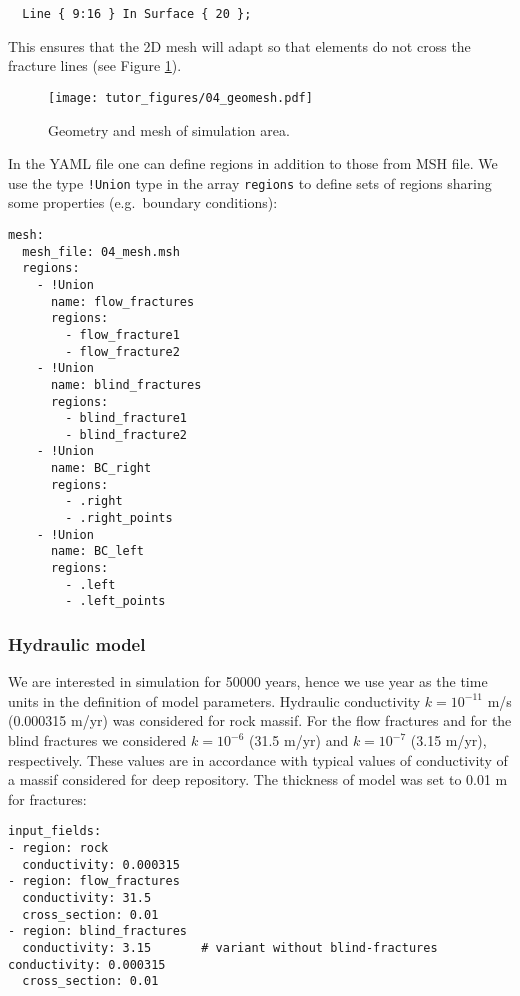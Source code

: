 \begin{verbatim}
  Line { 9:16 } In Surface { 20 };
\end{verbatim}

This ensures that the 2D mesh will adapt so that elements do not cross
the fracture lines (see Figure \ref{fig:mesh}).

\begin{figure}[htbp]
\centering
\texttt{[image: tutor\_figures/04\_geomesh.pdf]}
\caption{Geometry and mesh of simulation area.\label{fig:mesh}}
\end{figure}

In the YAML file one can define regions in addition to those from MSH
file. We use the type \texttt{!Union} type in the array \texttt{regions}
to define sets of regions sharing some properties (e.g.~boundary
conditions):

\begin{verbatim}
mesh:
  mesh_file: 04_mesh.msh
  regions:
    - !Union
      name: flow_fractures
      regions:
        - flow_fracture1
        - flow_fracture2
    - !Union
      name: blind_fractures
      regions:
        - blind_fracture1
        - blind_fracture2
    - !Union
      name: BC_right
      regions:
        - .right
        - .right_points
    - !Union
      name: BC_left
      regions:
        - .left
        - .left_points
\end{verbatim}

\subsubsection{Hydraulic model}

We are interested in simulation for 50000 years, hence we use year as
the time units in the definition of model parameters. Hydraulic
conductivity \(k = 10^{-11}\) m/s (0.000315 m/yr) was considered for
rock massif. For the flow fractures and for the blind fractures we
considered \(k = 10^{-6}\) (31.5 m/yr) and \(k = 10^{-7}\) (3.15 m/yr),
respectively. These values are in accordance with typical values of
conductivity of a massif considered for deep repository. The thickness
of model was set to 0.01 m for fractures:

\begin{verbatim}
input_fields:
- region: rock
  conductivity: 0.000315
- region: flow_fractures
  conductivity: 31.5
  cross_section: 0.01
- region: blind_fractures
  conductivity: 3.15       # variant without blind-fractures conductivity: 0.000315
  cross_section: 0.01
\end{verbatim}

